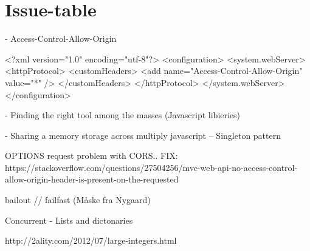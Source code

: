 \section{Issue-table}


- Access-Control-Allow-Origin

<?xml version="1.0" encoding="utf-8"?>
<configuration>
 <system.webServer>
   <httpProtocol>
     <customHeaders>
       <add name="Access-Control-Allow-Origin" value="*" />
     </customHeaders>
   </httpProtocol>
 </system.webServer>
</configuration>



- Finding the right tool among the masses (Javascript libieries)


- Sharing a memory storage across multiply javascript -- Singleton pattern



OPTIONS request problem with CORS..
FIX: https://stackoverflow.com/questions/27504256/mvc-web-api-no-access-control-allow-origin-header-is-present-on-the-requested


bailout // failfast (Måske fra Nygaard)

Concurrent - Lists and dictonaries


http://2ality.com/2012/07/large-integers.html